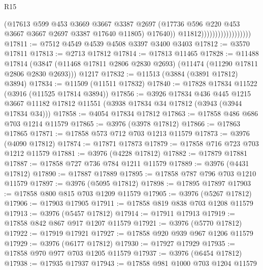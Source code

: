 \begin{lexlean}{R15}
\begin{coremodule}
                                          (@17613
                                            @599
                                            @453
                                            @3669
                                            @3667
                                            @3387
                                            @2697
                                            (@17736
                                              @596
                                              @220
                                              @453
                                              @3667
                                              @3667
                                              @2697
                                              @3387
                                              @17640
                                              @11805)
                                            @17640))
                                        @11812))))))))))))))))))
@17811 := @7512 @4549 @4539 @4508 @3397 @3400 @3403
@17812 := @3570 @17811
@17813 := @2713 @17812
@17814 := @17813 @11465
@17828 := @11488
    @17814
    (@3847 (@11468 @17811 @2806 @2830 @2693) (@11474 (@11290 @17811 @2806 @2830 @2693)))
    @1217
@17832 := @11513 (@3884 (@3891 @17812) @3894)
@17834 := @11509 (@11511 @17832)
@17840 := @17828 @17834 @11522 (@3916 (@11525 @17814 @3894))
@17856 := @3926
    @17834
    @436
    @445
    @1215
    @3667
    @11182
    @17812
    @11551
    (@3938 @17834 @34 @17812 (@3943 (@3944 @17834 @34)))
@17858 := @4054 @17834 @17812
@17863 := @17858 @486 @686 @703 @1214 @11579
@17865 := @3976 (@3978 @17812)
@17866 := @17863 @17865
@17871 := @17858 @573 @712 @703 @1213 @11579
@17873 := @3976 (@4090 @17812)
@17874 := @17871 @17873
@17879 := @17858 @716 @723 @703 @1212 @11579
@17881 := @3976 (@4228 @17812)
@17882 := @17879 @17881
@17887 := @17858 @727 @736 @784 @1211 @11579
@17889 := @3976 (@4431 @17812)
@17890 := @17887 @17889
@17895 := @17858 @787 @796 @703 @1210 @11579
@17897 := @3976 (@5095 @17812)
@17898 := @17895 @17897
@17903 := @17858 @800 @815 @703 @1209 @11579
@17905 := @3976 (@5267 @17812)
@17906 := @17903 @17905
@17911 := @17858 @819 @838 @703 @1208 @11579
@17913 := @3976 (@5457 @17812)
@17914 := @17911 @17913
@17919 := @17858 @842 @867 @917 @1207 @11579
@17921 := @3976 (@5770 @17812)
@17922 := @17919 @17921
@17927 := @17858 @920 @939 @967 @1206 @11579
@17929 := @3976 (@6177 @17812)
@17930 := @17927 @17929
@17935 := @17858 @970 @977 @703 @1205 @11579
@17937 := @3976 (@6454 @17812)
@17938 := @17935 @17937
@17943 := @17858 @981 @1000 @703 @1204 @11579

\end{coremodule}
\end{lexlean}
